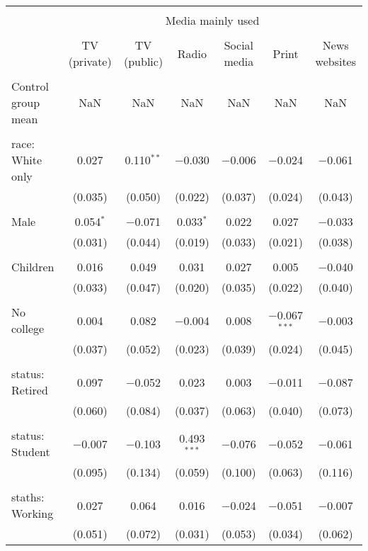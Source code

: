 
\begin{tabular}{@{\extracolsep{5pt}}lcccccc} 
\\[-1.8ex]\hline 
\hline \\[-1.8ex] 
 & \multicolumn{6}{c}{Media mainly used} \\ 
\cline{2-7} 
\\[-1.8ex] & TV (private) & TV (public) & Radio & Social media & Print & News websites \\ 
\hline \\[-1.8ex] 
 Control group mean & NaN & NaN & NaN & NaN & NaN & NaN  \\ \hline \\[-1.8ex] race: White only & 0.027 & 0.110$^{**}$ & $-$0.030 & $-$0.006 & $-$0.024 & $-$0.061 \\ 
  & (0.035) & (0.050) & (0.022) & (0.037) & (0.024) & (0.043) \\ 
  & & & & & & \\ 
 Male & 0.054$^{*}$ & $-$0.071 & 0.033$^{*}$ & 0.022 & 0.027 & $-$0.033 \\ 
  & (0.031) & (0.044) & (0.019) & (0.033) & (0.021) & (0.038) \\ 
  & & & & & & \\ 
 Children & 0.016 & 0.049 & 0.031 & 0.027 & 0.005 & $-$0.040 \\ 
  & (0.033) & (0.047) & (0.020) & (0.035) & (0.022) & (0.040) \\ 
  & & & & & & \\ 
 No college & 0.004 & 0.082 & $-$0.004 & 0.008 & $-$0.067$^{***}$ & $-$0.003 \\ 
  & (0.037) & (0.052) & (0.023) & (0.039) & (0.024) & (0.045) \\ 
  & & & & & & \\ 
 status: Retired & 0.097 & $-$0.052 & 0.023 & 0.003 & $-$0.011 & $-$0.087 \\ 
  & (0.060) & (0.084) & (0.037) & (0.063) & (0.040) & (0.073) \\ 
  & & & & & & \\ 
 status: Student & $-$0.007 & $-$0.103 & 0.493$^{***}$ & $-$0.076 & $-$0.052 & $-$0.061 \\ 
  & (0.095) & (0.134) & (0.059) & (0.100) & (0.063) & (0.116) \\ 
  & & & & & & \\ 
 staths: Working & 0.027 & 0.064 & 0.016 & $-$0.024 & $-$0.051 & $-$0.007 \\ 
  & (0.051) & (0.072) & (0.031) & (0.053) & (0.034) & (0.062) \\ 

\end{tabular}
